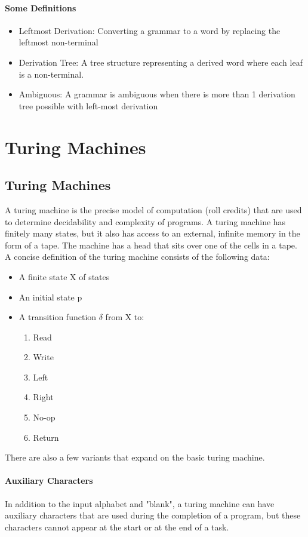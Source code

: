 \paragraph{Some Definitions}
\begin{itemize}
	\item Leftmost Derivation: Converting a grammar to a word by replacing the leftmost non-terminal
	\item Derivation Tree: A tree structure representing a derived word where each leaf is a non-terminal.
	\item Ambiguous: A grammar is ambiguous when there is more than 1 derivation tree possible with left-most derivation
\end{itemize}
\section{Turing Machines}
\subsection{Turing Machines}
A turing machine is the precise model of computation (roll credits) that are used to determine decidability and complexity of programs. A turing machine has finitely many states, but it also has access to an external, infinite memory in the form of a tape. The machine has a head that sits over one of the cells in a tape. A concise definition of the turing machine consists of the following data:
\begin{itemize}
	\item A finite state X of states
	\item An initial state p
	\item A transition function $\delta$ from X to:
	\begin{enumerate}
		\item Read
		\item Write
		\item Left
		\item Right
		\item No-op
		\item Return
	\end{enumerate}
\end{itemize}
There are also a few variants that expand on the basic turing machine.
\paragraph{Auxiliary Characters} In addition to the input alphabet and "blank", a turing machine can have auxiliary characters that are used during the completion of a program, but these characters cannot appear at the start or at the end of a task.
